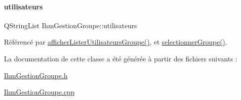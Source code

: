 \mbox{\label{class_ihm_gestion_groupe_a1f14e24cf672c5d0b6ae86084f758846}} 
\paragraph{\texorpdfstring{utilisateurs}{utilisateurs}}
{\footnotesize\ttfamily Q\+String\+List Ihm\+Gestion\+Groupe\+::utilisateurs\hspace{0.3cm}{\ttfamily [private]}}



Référencé par \hyperlink{class_ihm_gestion_groupe_a491098bb1e69aa1c09b76c3459da067f}{afficher\+Lister\+Utilisateurs\+Groupe()}, et \hyperlink{class_ihm_gestion_groupe_a322f2c8584ae8e5be7f2075b73905beb}{selectionner\+Groupe()}.



La documentation de cette classe a été générée à partir des fichiers suivants \+:\begin{DoxyCompactItemize}
\item 
\hyperlink{_ihm_gestion_groupe_8h}{Ihm\+Gestion\+Groupe.\+h}\item 
\hyperlink{_ihm_gestion_groupe_8cpp}{Ihm\+Gestion\+Groupe.\+cpp}\end{DoxyCompactItemize}
